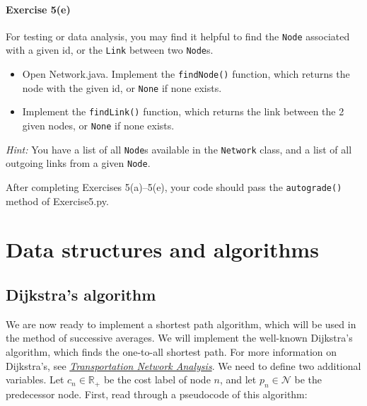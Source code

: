 \documentclass[11pt]{article}
\newcommand{\N}{\mathcal{N}}
\begin{document}
\paragraph*{Exercise 5(e)} For testing or data analysis, you may find it helpful to find the \texttt{Node} associated with a given id, or the \texttt{Link} between two \texttt{Node}s. 
\begin{itemize}
	\item Open Network.java. Implement the \texttt{findNode()} function, which returns the node with the given id, or \texttt{None} if none exists.
	
	\item Implement the \texttt{findLink()} function, which returns the link between the 2 given nodes, or \texttt{None} if none exists.
\end{itemize}
\textit{Hint:} You have a list of all \texttt{Node}s available in the \texttt{Network} class, and a list of all outgoing links from a given \texttt{Node}. 


 \vspace{\baselineskip}


\noindent
After completing Exercises 5(a)--5(e), your code should pass the \texttt{autograde()} method of Exercise5.py. 




\section{Data structures and algorithms}


\subsection{Dijkstra's algorithm}


We are now ready to implement a shortest path algorithm, which will be used in the method of successive averages. We will implement the well-known Dijkstra's algorithm, which finds the one-to-all shortest path. For more information on Dijkstra's, see \href{https://sboyles.github.io/blubook.html}{\textit{Transportation Network Analysis}}. We need to define two additional variables. Let $c_n\in\mathbb{R}_+$ be the cost label of node $n$, and let $p_n\in\N$ be the predecessor node. First, read through a pseudocode of this algorithm:


\vspace{\baselineskip}
\end{document}

